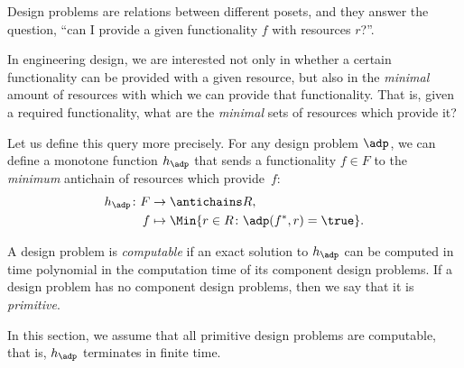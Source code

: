 
\label{sec:computation}

Design problems are relations between different posets, and they answer the question, ``can I provide a given functionality $f$ with resources $r$?''.

In engineering design, we are interested not only in whether a certain functionality can be provided with a given resource, but also in the \emph{minimal} amount of resources with which we can provide that functionality. That is, given a required functionality, what are the \emph{minimal} sets of resources which provide it?

Let us define this query more precisely.
For any design problem $\adp$, we can define a monotone function $h_\adp$ that sends a functionality $f \in F$ to the \emph{minimum} antichain of resources which provide~$f$:
\begin{equation}
\begin{aligned}
h_\adp \colon F &\to \antichains R, \\
f &\mapsto \Min \{ r \in R \colon \adp(f^*, r) = \true \}.
\end{aligned}
\end{equation}

\begin{definition}
A design problem is \emph{computable} if an exact solution to $h_\adp$ can be computed in time polynomial in the computation time of its component design problems. If a design problem has no component design problems, then we say that it is \emph{primitive}.
\end{definition}

In this section, we assume that all primitive design problems are computable, that is, $h_\adp$ terminates in finite time.


